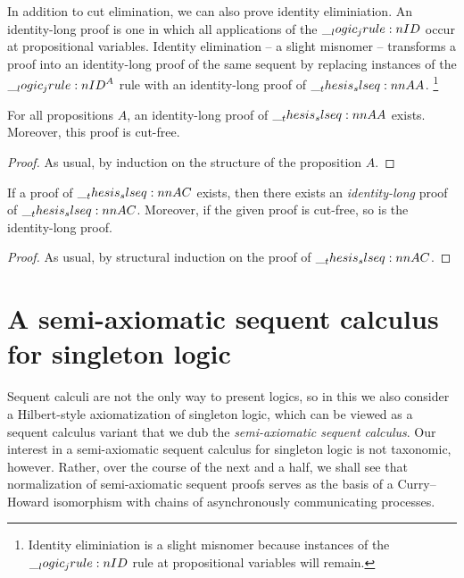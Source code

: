 In addition to cut elimination, we can also prove identity eliminiation.
An identity-long proof is one in which all applications of the $\__logic_jrule:n {ID}$ occur at propositional variables.
Identity elimination -- a slight misnomer -- transforms a proof into an identity-long proof of the same sequent by replacing instances of the $\__logic_jrule:n {ID}^A$ rule with an identity-long proof of $\slseq{A |- A}$.%
\footnote{Identity eliminiation is a slight misnomer because instances of the $\__logic_jrule:n {ID}$ rule at propositional variables will remain.}

\begin{lemma}
  For all propositions $A$, an identity-long proof of $\slseq{A |- A}$ exists.
  Moreover, this proof is cut-free.
\end{lemma}
\begin{proof}
  As usual, by induction on the structure of the proposition $A$.
\end{proof}

\begin{theorem}
  If a proof of $\slseq{A |- C}$ exists, then there exists an \emph{identity-long} proof of $\slseq{A |- C}$.
  Moreover, if the given proof is cut-free, so is the identity-long proof.
\end{theorem}
\begin{proof}
  As usual, by structural induction on the proof of $\slseq{A |- C}$.
\end{proof}


\section{A semi-axiomatic sequent calculus for singleton logic}\label{sec:singleton-logic:hilbert}

Sequent calculi are not the only way to present logics, so
in this  we also consider a Hilbert-style axiomatization of singleton logic, which can be viewed as a sequent calculus variant that we dub the \emph{semi-axiomatic sequent calculus}\autocite{DeYoung+:FSCD20}.
Our interest in a semi-axiomatic sequent calculus for singleton logic is not taxonomic, however.
Rather, over the course of the next  and a half, we shall see that normalization of semi-axiomatic sequent proofs serves as the basis of a Curry--Howard isomorphism with chains of asynchronously communicating processes.

